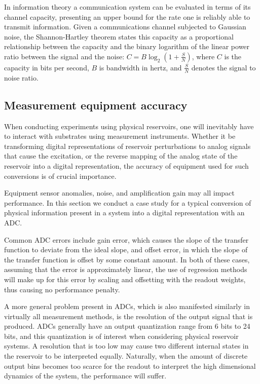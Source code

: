 In information theory a communication system can be evaluated in terms of its
channel capacity, presenting an upper bound for the rate one is reliably able to
transmit information. Given a communications channel subjected to Gaussian
noise, the Shannon-Hartley theorem \cite{shannon_communication_1949} states this
capacity as a proportional relationship between the capacity and the binary
logarithm of the linear power ratio between the signal and the noise: $C =
B\log_2(1 + \frac{S}{N})$, where $C$ is the capacity in bits per second, $B$ is
bandwidth in hertz, and $\frac{S}{N}$ denotes the signal to noise ratio.

\subsection{Measurement equipment accuracy}

When conducting experiments using physical reservoirs, one will inevitably have
to interact with substrates using measurement instruments. Whether it be
transforming digital representations of reservoir perturbations to analog
signals that cause the excitation, or the reverse mapping of the analog state of
the reservoir into a digital representation, the accuracy of equipment used for
such conversions is of crucial importance.

Equipment sensor anomalies, noise, and amplification gain may all impact
performance. In this section we conduct a case study for a typical conversion of
physical information present in a system into a digital representation with an
ADC.

Common ADC errors include gain error, which causes the slope of the transfer
function to deviate from the ideal slope, and offset error, in which the slope
of the transfer function is offset by some constant amount. In both of these
cases, assuming that the error is approximately linear, the use of regression
methods will make up for this error by scaling and offsetting with the readout
weights, thus causing no performance penalty.

A more general problem present in ADCs, which is also manifested similarly in
virtually all measurement methods, is the resolution of the output signal that
is produced. ADCs generally have an output quantization range from 6 bits to 24
bits, and this quantization is of interest when considering physical reservoir
systems. A resolution that is too low may cause two different internal states in
the reservoir to be interpreted equally. Naturally, when the amount of discrete
output bins becomes too scarce for the readout to interpret the high dimensional
dynamics of the system, the performance will suffer.

